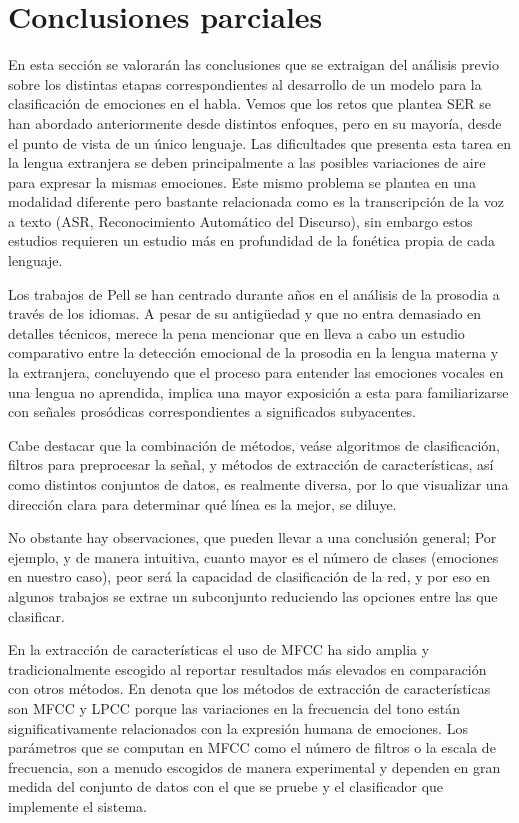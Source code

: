 \documentclass[11pt,a4paper,spanish]{book}
\begin{document}
	\section{Conclusiones parciales}
	En esta sección se valorarán las conclusiones que se extraigan del análisis previo sobre los distintas etapas correspondientes al desarrollo de un modelo para la clasificación de emociones en el habla. Vemos que los retos que plantea SER se han abordado anteriormente desde distintos enfoques, pero en su mayoría, desde el punto de vista de un único lenguaje. Las dificultades que presenta esta tarea en la lengua extranjera se deben principalmente a las posibles variaciones de aire para expresar la mismas emociones. Este mismo problema se plantea en una modalidad diferente pero bastante relacionada como es la transcripción de la voz a texto (ASR, Reconocimiento Automático del Discurso), sin embargo estos estudios requieren un estudio más en profundidad de la fonética propia de cada lenguaje.
	
	Los trabajos de Pell se han centrado durante años en el análisis de la prosodia a través de los idiomas. A pesar de su antigüedad y que no entra demasiado en detalles técnicos, merece la pena mencionar que en \cite{Pell2008} lleva a cabo un estudio comparativo entre la detección emocional de la prosodia en la lengua materna y la extranjera, concluyendo que el proceso para entender las emociones vocales en una lengua no aprendida, implica una mayor exposición a esta para familiarizarse con señales prosódicas correspondientes a significados subyacentes.\hfill \break
	
	
	Cabe destacar que la combinación de métodos, veáse algoritmos de clasificación, filtros para preprocesar la señal, y métodos de extracción de características, así como distintos conjuntos de datos, es realmente diversa, por lo que visualizar una dirección clara para determinar qué línea es la mejor, se diluye. 
	
	No obstante hay observaciones, que pueden llevar a una conclusión general; Por ejemplo, y de manera intuitiva, cuanto mayor es el número de clases (emociones en nuestro caso), peor será la capacidad de clasificación de la red, y por eso en algunos trabajos se extrae un subconjunto reduciendo las opciones entre las que clasificar.  
	
	En la extracción de características el uso de MFCC ha sido amplia y tradicionalmente escogido al reportar resultados más elevados en comparación con otros métodos. En \cite{Langari2020} denota que los métodos de extracción de características son MFCC y LPCC porque las variaciones en la frecuencia del tono están significativamente relacionados con la expresión humana de emociones. Los parámetros que se computan en MFCC como el número de filtros o la escala de frecuencia, son a menudo escogidos de manera experimental y dependen en gran medida del conjunto de datos con el que se pruebe y el clasificador que implemente el sistema.
	
\end{document}
